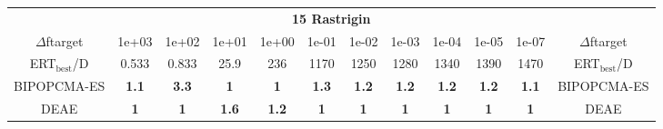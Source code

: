 \begin{tabular}{cccccccccccc}
 & \multicolumn{10}{c}{{\normalsize \textbf{15 Rastrigin}}}\\
$\Delta$ftarget& 1e+03& 1e+02& 1e+01& 1e+00& 1e-01& 1e-02& 1e-03& 1e-04& 1e-05& 1e-07 & $\Delta$ftarget \\
ERT$_{\textrm{best}}$/D& 0.533& 0.833& 25.9& 236& 1170& 1250& 1280& 1340& 1390& 1470 & ERT$_{\textrm{best}}$/D \\
\hline
BIPOPCMA-ES & \textbf{1.1} & \textbf{3.3} & \textbf{1} & \textbf{1} & \textbf{1.3} & \textbf{1.2} & \textbf{1.2} & \textbf{1.2} & \textbf{1.2} & \textbf{1.1} & BIPOPCMA-ES \cite{add_an_entry_for_BIPOPCMA-ES_in_bbob.bib}\\
DEAE & \textbf{1} & \textbf{1} & \textbf{1.6} & \textbf{1.2} & \textbf{1} & \textbf{1} & \textbf{1} & \textbf{1} & \textbf{1} & \textbf{1} & DEAE \cite{add_an_entry_for_DEAE_in_bbob.bib}
\end{tabular}
